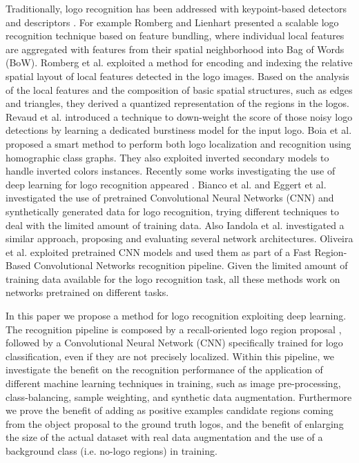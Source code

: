 \documentclass[final,5p,twocolumn]{elsarticle}
\begin{document}
Traditionally, logo recognition has been addressed with keypoint-based detectors and descriptors \cite{bagdanov2007trademark,kleban2008spatial,joly2009logo,meng2010interactive}. For example Romberg and Lienhart \cite{romberg2013bundle} presented a scalable logo recognition technique based on feature bundling, where individual local features are aggregated with features from their spatial neighborhood into Bag of Words (BoW). Romberg et al. \cite{romberg2011scalable} exploited a method for encoding and indexing the relative spatial layout of local features detected in the logo images. Based on the analysis of the local features and the composition of basic spatial structures, such as edges and triangles, they derived a quantized representation of the regions in the logos. Revaud et al. \cite{revaud2012correlation} introduced a technique to down-weight the score of those noisy logo detections by learning a dedicated burstiness model for the input logo. {Boia et al. \cite{boia2016logo,boia2015elliptical} proposed a smart method to perform both logo localization and recognition using homographic class graphs. They also exploited inverted secondary models to handle inverted colors instances.}
Recently some works investigating the use of deep learning for logo recognition appeared \cite{bianco2015logo,eggert2015benefit,iandola2015deeplogo}.
Bianco et al. \cite{bianco2015logo} and  Eggert et al. \cite{eggert2015benefit} investigated the use of pretrained Convolutional Neural Networks (CNN) and synthetically generated data for logo recognition,
trying different techniques to deal with the limited amount of training data. Also Iandola et al. \cite{iandola2015deeplogo} investigated a similar approach, proposing and evaluating several network architectures. {Oliveira et al. \cite{oliveira2016automatic} exploited pretrained CNN models and used them as part of a Fast Region-Based Convolutional Networks recognition pipeline.}
Given the limited amount of training data available for the logo recognition task, all these methods work on networks pretrained on different tasks.

In this paper we propose a method for logo recognition exploiting deep learning. The recognition pipeline is composed by a recall-oriented logo region proposal \cite{girshick2016region}, followed by a Convolutional Neural Network (CNN) specifically trained for logo classification, even if they are not precisely localized.
Within this pipeline, we investigate the benefit on the recognition performance of the application of different machine learning techniques in training, such as image pre-processing, class-balancing, sample weighting, and synthetic data augmentation.
Furthermore we prove the benefit of adding as positive examples candidate regions coming from the object proposal to the ground truth logos, and the benefit of enlarging the size of the actual dataset with real data augmentation and the use of a background class (i.e. no-logo regions) in training.
\end{document}
